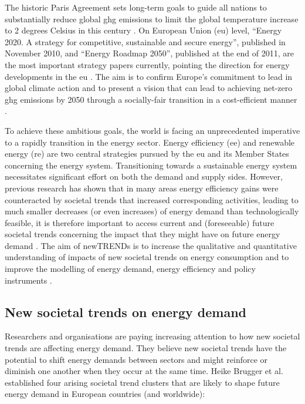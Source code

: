 The historic Paris Agreement sets long-term goals to guide all nations to substantially reduce global \gls{ghg} emissions to limit the global temperature increase to 2 degrees Celsius in this century \cite{paris}. 
On European Union (\gls{eu}) level, “Energy 2020. A strategy for competitive, sustainable and secure energy”, published in November 2010, and “Energy Roadmap 2050”, published at the end of 2011, are the most important strategy papers currently, pointing the direction for energy developments in the \gls{eu} \cite{roadmap}. 
The aim is to confirm Europe's commitment to lead in global climate action and to present a vision that can lead to achieving net-zero \gls{ghg} emissions by 2050 through a socially-fair transition in a cost-efficient manner \cite{clean}. 

To achieve these ambitious goals, the world is facing an unprecedented imperative to a rapidly transition in the energy sector. 
Energy efficiency (\gls{ee}) and renewable energy (\gls{re}) are two central strategies pursued by the \gls{eu} and its Member States concerning the energy system. 
Transitioning towards a sustainable energy system necessitates significant effort on both the demand and supply sides. 
However, previous research has shown that in many areas energy efficiency gains were counteracted by societal trends that increased corresponding activities, leading to much smaller decreases (or even increases) of energy demand than technologically feasible, it is therefore important to access current and (foreseeable) future societal trends concerning the impact that they might have on future energy demand \cite{2050}. 
The aim of newTRENDs is to increase the qualitative and quantitative understanding of impacts of new societal trends on energy consumption and to improve the modelling of energy demand, energy efficiency and policy instruments \cite{fraunhofer}. 


\subsection{New societal trends on energy demand}

Researchers and organisations are paying increasing attention to how new societal trends are affecting energy demand.
They believe new societal trends have the potential to shift energy demands between sectors and might reinforce or diminish one another when they occur at the same time. 
Heike Brugger et al. \cite{2050} established four arising societal trend clusters that are likely to shape future energy demand in European countries (and worldwide):  


